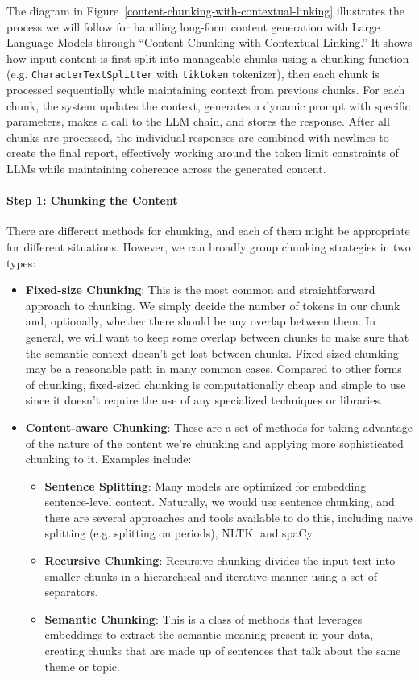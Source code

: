 The diagram in Figure~\ref{content-chunking-with-contextual-linking} illustrates the process we will follow for handling long-form content generation with Large Language Models through ``Content Chunking with Contextual Linking.'' It shows how input content is first split into manageable chunks using a chunking function (e.g. \texttt{CharacterTextSplitter} with \texttt{tiktoken} tokenizer), then each chunk is processed sequentially while maintaining context from previous chunks. For each chunk, the system updates the context, generates a dynamic prompt with specific parameters, makes a call to the LLM chain, and stores the response. After all chunks are processed, the individual responses are combined with newlines to create the final report, effectively working around the token limit constraints of LLMs while maintaining coherence across the generated content.
\paragraph{Step 1: Chunking the Content}

There are different methods for chunking, and each of them might be appropriate for different situations. However, we can broadly group chunking strategies in two types:

\begin{itemize}
\item \textbf{Fixed-size Chunking}: This is the most common and straightforward approach to chunking. We simply decide the number of tokens in our chunk and, optionally, whether there should be any overlap between them. In general, we will want to keep some overlap between chunks to make sure that the semantic context doesn't get lost between chunks. Fixed-sized chunking may be a reasonable path in many common cases. Compared to other forms of chunking, fixed-sized chunking is computationally cheap and simple to use since it doesn't require the use of any specialized techniques or libraries.

\item \textbf{Content-aware Chunking}: These are a set of methods for taking advantage of the nature of the content we're chunking and applying more sophisticated chunking to it. Examples include:
  \begin{itemize}
  \item \textbf{Sentence Splitting}: Many models are optimized for embedding sentence-level content. Naturally, we would use sentence chunking, and there are several approaches and tools available to do this, including naive splitting (e.g. splitting on periods), NLTK, and spaCy.
  \item \textbf{Recursive Chunking}: Recursive chunking divides the input text into smaller chunks in a hierarchical and iterative manner using a set of separators.
  \item \textbf{Semantic Chunking}: This is a class of methods that leverages embeddings to extract the semantic meaning present in your data, creating chunks that are made up of sentences that talk about the same theme or topic.
  \end{itemize}
\end{itemize}

